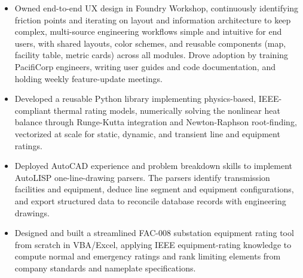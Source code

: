 \documentclass[10pt, letterpaper]{article}
\newenvironment{rlist}{%
  \begin{itemize}[leftmargin=1.4em, itemsep=1pt, topsep=2pt, parsep=0pt]%
}{%
  \end{itemize}%
}
\begin{document}
\begin{rlist}
  \item Owned end-to-end UX design in Foundry Workshop, continuously identifying friction points and iterating on layout and information architecture to keep complex, multi-source engineering workflows simple and intuitive for end users, with shared layouts, color schemes, and reusable components (map, facility table, metric cards) across all modules. Drove adoption by training PacifiCorp engineers, writing user guides and code documentation, and holding weekly feature-update meetings.
  \item Developed a reusable Python library implementing physics-based, IEEE-compliant thermal rating models, numerically solving the nonlinear heat balance through Runge-Kutta integration and Newton-Raphson root-finding, vectorized at scale for static, dynamic, and transient line and equipment ratings.
  \item Deployed AutoCAD experience and problem breakdown skills to implement AutoLISP one-line-drawing parsers. The parsers identify transmission facilities and equipment, deduce line segment and equipment configurations, and export structured data to reconcile database records with engineering drawings.
  \item Designed and built a streamlined FAC-008 substation equipment rating tool from scratch in VBA/Excel, applying IEEE equipment-rating knowledge to compute normal and emergency ratings and rank limiting elements from company standards and nameplate specifications.
\end{rlist}
\end{document}
